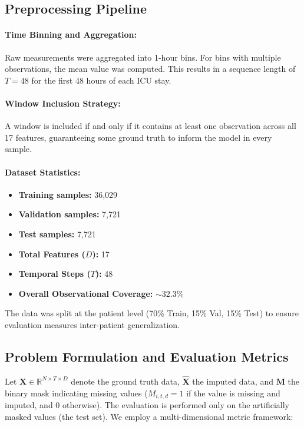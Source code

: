 \subsection{Preprocessing Pipeline}
\paragraph{Time Binning and Aggregation:} Raw measurements were aggregated into 1-hour bins. For bins with multiple observations, the mean value was computed. This results in a sequence length of $T=48$ for the first 48 hours of each ICU stay.

\paragraph{Window Inclusion Strategy:} A window is included if and only if it contains at least one observation across all 17 features, guaranteeing some ground truth to inform the model in every sample.

\paragraph{Dataset Statistics:}
\begin{itemize}
    \item \textbf{Training samples:} 36,029
    \item \textbf{Validation samples:} 7,721
    \item \textbf{Test samples:} 7,721
    \item \textbf{Total Features ($D$):} 17
    \item \textbf{Temporal Steps ($T$):} 48
    \item \textbf{Overall Observational Coverage:} $\sim 32.3\%$
\end{itemize}
The data was split at the patient level (70\% Train, 15\% Val, 15\% Test) to ensure evaluation measures inter-patient generalization.

\subsection{Problem Formulation and Evaluation Metrics}
Let $\mathbf{X} \in \mathbb{R}^{N \times T \times D}$ denote the ground truth data, $\hat{\mathbf{X}}$ the imputed data, and $\mathbf{M}$ the binary mask indicating missing values ($M_{i,t,d} = 1$ if the value is missing and imputed, and 0 otherwise). The evaluation is performed only on the artificially masked values (the test set). We employ a multi-dimensional metric framework:


